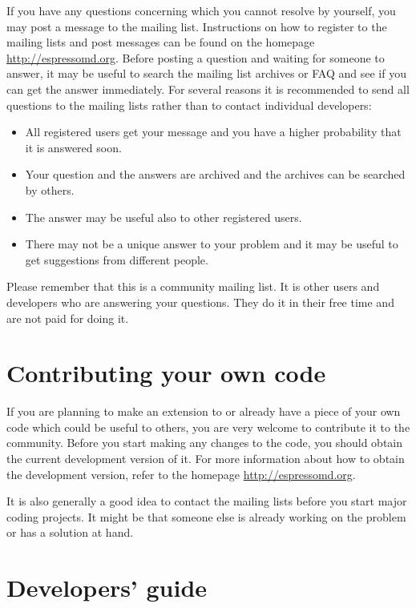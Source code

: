 If you have any questions concerning \es which you cannot
resolve by yourself, you may post a message to
the mailing list. Instructions on how to register to the mailing
lists and post messages can be found on the homepage 
\url{http://espressomd.org}.
Before posting a question and waiting for someone to answer, 
it may be useful to search the mailing list archives or FAQ and 
see if you can get the answer immediately.
For several reasons it is recommended to send all questions 
to the mailing lists rather than to contact individual developers:
\begin{itemize}
  \item All registered users get your message and you have a higher 
  probability that it is answered soon.
  \item Your question and the answers are archived and the archives
  can be searched by others.
  \item The answer may be useful also to other registered users.
  \item There may not be a unique answer to your problem and it may 
  be useful to get suggestions from different people.
\end{itemize}

Please remember that this is a community mailing list. It is other
users and developers who are answering your questions. They do it
in their free time and are not paid for doing it.


\section{Contributing your own code}

If you are planning to make an extension to \es or 
already have a piece of your own code which could be useful 
to others, you are very welcome to contribute it to 
the community. 
Before you start making any changes to the code, you
should obtain the current development version of it.
For more information about how to obtain the
development version, refer to the homepage \url{http://espressomd.org}.

It is also generally a good idea to contact the mailing lists before
you start major coding projects. It might be that someone else is
already working on the problem or has a solution at hand.

\section{Developers' guide}
\label{sec:dg}

